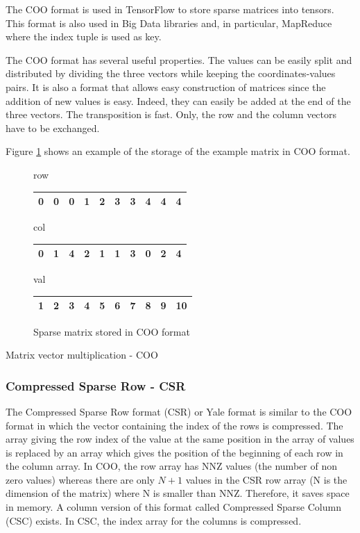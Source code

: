 The COO format is used in TensorFlow to store sparse matrices into tensors.
This format is also used in Big Data libraries and, in particular, MapReduce \cite{DeanG2004} where the index tuple is used as key.

The COO format has several useful properties.
The values can be easily split and distributed by dividing the three vectors while keeping the coordinates-values pairs.
It is also a format that allows easy construction of matrices since the addition of new values is easy.
Indeed, they can easily be added at the end of the three vectors.
The transposition is fast.
Only, the row and the column vectors have to be exchanged.

Figure \ref{fig:methods:coo_ex} shows an example of the storage of the example matrix in COO format.

\begin{figure}[h]
\centering
row
\bigskip
\begin{tabular}{|cccccccccc|}
\hline
0 & 0 & 0 & 1 & 2 & 3 & 3 & 4 & 4 & 4  \\
\hline
\end{tabular}

col
\bigskip
\begin{tabular}{|cccccccccc|}
\hline
0 & 1 & 4 & 2 & 1 & 1 & 3 & 0 & 2 & 4 \\
\hline
\end{tabular}

val
\bigskip
\begin{tabular}{|cccccccccc|}
\hline
1 & 2 & 3 & 4 & 5 & 6 & 7 & 8 & 9 & 10 \\
\hline
\end{tabular}
\caption{Sparse matrix stored in COO format \label{fig:methods:coo_ex}}
\end{figure}

\begin{algorithm}[h]
	\DontPrintSemicolon
	\caption{Matrix vector multiplication - COO\label{fig:methods:coo_algo}}
\end{algorithm}

\subsubsection{Compressed Sparse Row - CSR}
The Compressed Sparse Row format (CSR) \cite{HacBG1971} \cite{Gusta1972} or Yale format \cite{EiESS1977} is similar to the COO format in which the vector containing the index of the rows is compressed.
The array giving the row index of the value at the same position in the array of values is replaced by an array which gives the position of the beginning of each row in the column array.
In COO, the row array has NNZ values (the number of non zero values) whereas there are only $N+1$ values in the CSR row array (N is the dimension of the matrix) where N is smaller than NNZ.
Therefore, it saves space in memory.
A column version of this format called Compressed Sparse Column (CSC) exists.
In CSC, the index array for the columns is compressed.

